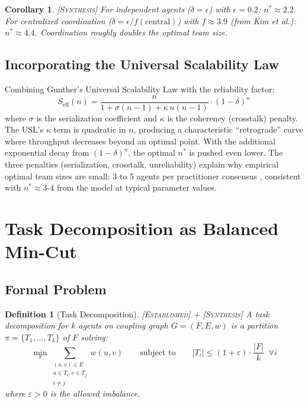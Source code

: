 \documentclass[11pt, a4paper, copyright]{googledeepmind}
\newtheorem{definition}{Definition}[section]
\newtheorem{corollary}[theorem]{Corollary}
\newcommand{\established}{\textsc{[Established]}}
\newcommand{\synthesis}{\textsc{[Synthesis]}}
\begin{document}
\begin{corollary} \synthesis{}
For independent agents ($\delta = \epsilon$) with $\epsilon = 0.2$: $n^* \approx 2.2$.
For centralized coordination ($\delta = \epsilon / f(\mathrm{central})$) with $f \approx 3.9$ (from Kim et al.): $n^* \approx 4.4$.
Coordination roughly doubles the optimal team size.
\end{corollary}

\subsection{Incorporating the Universal Scalability Law}

Combining Gunther's Universal Scalability Law \citep{Gunther2008} with the reliability factor:
\begin{equation}
\label{eq:usl-extended}
  S_{\mathrm{eff}}(n) = \frac{n}{1 + \sigma(n-1) + \kappa \, n(n-1)} \cdot (1-\delta)^n
\end{equation}
where $\sigma$ is the serialization coefficient and $\kappa$ is the coherency (crosstalk) penalty.
The USL's $\kappa$ term is quadratic in $n$, producing a characteristic ``retrograde'' curve where throughput decreases beyond an optimal point.
With the additional exponential decay from $(1-\delta)^n$, the optimal $n^*$ is pushed even lower.
The three penalties (serialization, crosstalk, unreliability) explain why empirical optimal team sizes are small: 3 to 5 agents per practitioner consensus \citep{Osmani2025}, consistent with $n^* \approx 3$-$4$ from the model at typical parameter values.


\section{Task Decomposition as Balanced Min-Cut}
\label{sec:decomp}

\subsection{Formal Problem}

\begin{definition}[Task Decomposition] \established{} + \synthesis{}
\label{def:decomp}
A task decomposition for $k$ agents on coupling graph $G = (F, E, w)$ is a partition $\pi = \{T_1, \ldots, T_k\}$ of $F$ solving:
\begin{equation}
\label{eq:mincut}
  \min_\pi \sum_{\substack{(u,v) \in E \\ u \in T_i, v \in T_j \\ i \neq j}} w(u,v) \qquad \text{subject to} \qquad |T_i| \leq (1+\varepsilon) \cdot \frac{|F|}{k} \;\; \forall i
\end{equation}
where $\varepsilon > 0$ is the allowed imbalance.
\end{definition}
\end{document}
